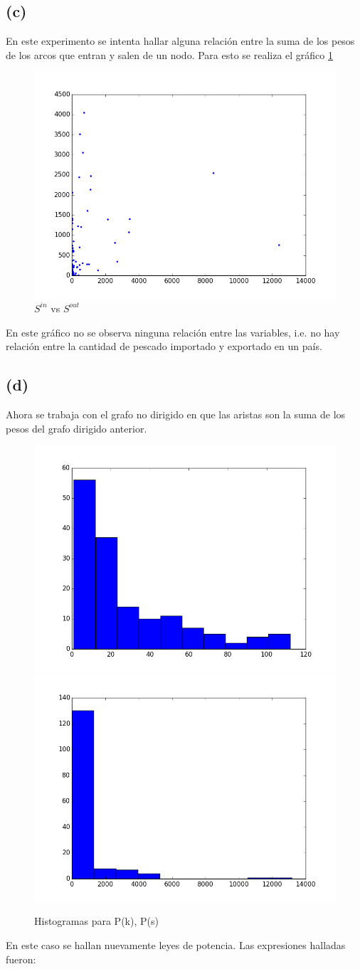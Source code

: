 \documentclass[letterpaper]{article}
\begin{document}
\subsection*{(c)}
En este experimento se intenta hallar alguna relación entre la suma de los pesos de los arcos que entran y salen de un nodo. Para esto se realiza el gráfico \ref{chart:2}
\begin{figure}[H]
  \centering
  \includegraphics[width=.75\linewidth]{img/p9-s-s.png}\hfill
  \caption{$S^{in}$ vs $S^{out}$}
  \label{chart:2}
\end{figure}

En este gráfico no se observa ninguna relación entre las variables, i.e. no hay relación entre la cantidad de pescado importado y exportado en un país.

\subsection*{(d)}
Ahora se trabaja con el grafo no dirigido en que las aristas son la suma de los pesos del grafo dirigido anterior.
\begin{figure}[H]
  \centering
  \includegraphics[width=.49\linewidth]{img/p9-k.png}\hfill
  \includegraphics[width=.49\linewidth]{img/p9-s.png}\hfill
  \caption{Histogramas para P(k), P(s)}
  \label{chart:3}
\end{figure}
En este caso se hallan nuevamente leyes de potencia. Las expresiones halladas fueron:
\end{document}
